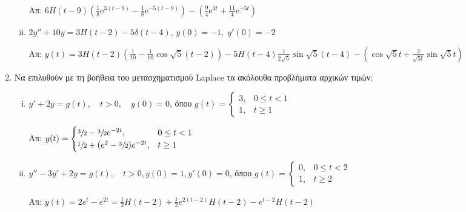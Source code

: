 \begin{enumerate}
\begin{enumerate}[i)]
        \hfill Απ: $ 6H(t-9) \left(\frac{1}{8} \mathrm{e}^{3(t-9)} - \frac{1}{8}
        \mathrm{e}^{-5(t-9)}\right) - \left(\frac{9}{4} \mathrm{e}^{3t} + \frac{11}{4}
        \mathrm{e}^{-5t}\right) $ 
      \item $ 2y''+10y=3H(t-2) - 5 \delta (t-4) $, \quad$ y(0)=-1, \; y'(0)=-2$ 

        \hfill Απ: $ y(t) = 3H(t-2)\left(\frac{1}{10} - \frac{1}{10} 
        \cos{\sqrt{5} (t-2)}\right) - 5 H(t-4) \frac{1}{2 \sqrt{5}} 
        \sin{\sqrt{5} (t-4)} - \left(\cos{\sqrt{5} t} + \frac{2}{\sqrt{5 t}} 
        \sin{\sqrt{5} t}\right)$ 
    \end{enumerate}

  \item Να επιλυθούν με τη βοήθεια του μετασχηματισμού Laplace τα ακόλουθα 
    προβλήματα αρχικών τιμών:
    \begin{enumerate}[i)]
      \item $y'+2y=g(t),\quad t>0,\quad y(0)=0$, 
        όπου $g(t)=
        \begin{cases}
          3, & 0\leq t<1 \\ 1, & t\geq 1
        \end{cases}$

        \hfill Απ: $y(t)=
        \begin{cases} 
          \sfrac{3}{2}-\sfrac{3}{2}e^{-2t},& 0\leq t<1 \\ 
          \sfrac{1}{2}+(e^2-\sfrac{3}{2})e^{-2t}, & t\geq 1
        \end{cases}$

      \item $y''-3y'+2y=g(t),\quad t>0, y(0)=1, y'(0)=0$, 
        όπου $g(t)=
        \begin{cases} 
          0, & 0\leq t<2 \\ 1, & t\geq 2
        \end{cases}$

        \hfill Απ: $y(t)=2e^t-e^{2t}=\frac{1}{2}H(t-2)+
        \frac{1}{2}e^{2(t-2)}H(t-2)-e^{t-2}H(t-2)$
    \end{enumerate}


\end{enumerate}
